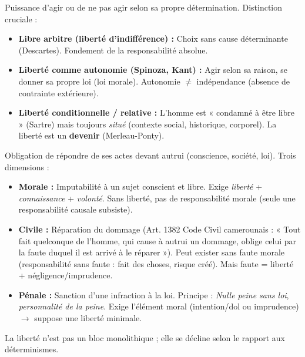 \documentclass[11pt]{article}
\newcommand{\cle}[1]{{\popxbold\color{popdark}#1}}
\newcounter{popsec}
\newcounter{popsub}
\newcommand{\courssub}[1]{%
  \stepcounter{popsub}%
  \par\vspace{9pt}\noindent{\popxbold\fontsize{11.5}{13}\selectfont\color{popink}{\color{poporange}\thepopsec.\thepopsub}\hspace{6pt}#1}\par\nopagebreak\vspace{4pt}
}
\begin{document}
\begin{definition}[Liberté]
Puissance d'agir ou de ne pas agir selon sa propre détermination. Distinction cruciale :
\begin{itemize}
    \item \textbf{Libre arbitre (liberté d'indifférence) :} Choix sans cause déterminante (Descartes). Fondement de la responsabilité absolue.
    \item \textbf{Liberté comme autonomie (Spinoza, Kant) :} Agir selon sa raison, se donner sa propre loi (loi morale). \cle{Autonomie} $\neq$ indépendance (absence de contrainte extérieure).
    \item \textbf{Liberté conditionnelle / relative :} L'homme est « condamné à être libre » (Sartre) mais toujours \textit{situé} (contexte social, historique, corporel). La liberté est un \textbf{devenir} (Merleau-Ponty).
\end{itemize}
\end{definition}

\begin{definition}[Responsabilité]
Obligation de répondre de ses actes devant autrui (conscience, société, loi). Trois dimensions :
\begin{itemize}
    \item \textbf{Morale :} Imputabilité à un sujet conscient et libre. Exige \textit{liberté} + \textit{connaissance} + \textit{volonté}. Sans liberté, pas de responsabilité morale (seule une responsabilité causale subsiste).
    \item \textbf{Civile :} Réparation du dommage (Art. 1382 Code Civil camerounais : « Tout fait quelconque de l'homme, qui cause à autrui un dommage, oblige celui par la faute duquel il est arrivé à le réparer »). Peut exister sans faute morale (responsabilité sans faute : fait des choses, risque créé). Mais faute = liberté + négligence/imprudence.
    \item \textbf{Pénale :} Sanction d'une infraction à la loi. Principe : \textit{Nulle peine sans loi}, \textit{personnalité de la peine}. Exige l'élément moral (intention/dol ou imprudence) $\rightarrow$ suppose une liberté minimale.
\end{itemize}
\end{definition}

\courssub{Les formes de la liberté}
La liberté n'est pas un bloc monolithique ; elle se décline selon le rapport aux déterminismes.
\end{document}
